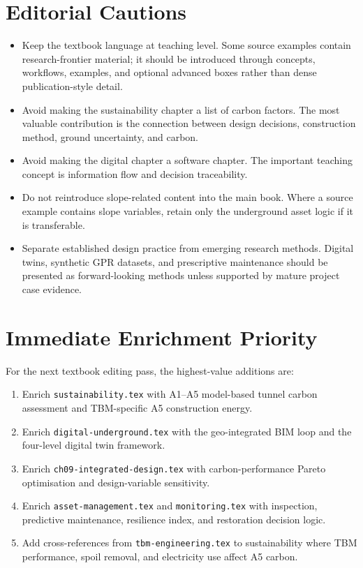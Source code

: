 \documentclass[11pt]{article}
\begin{document}
\section{Editorial Cautions}

\begin{itemize}
  \item Keep the textbook language at teaching level. Some source examples contain
  research-frontier material; it should be introduced through concepts,
  workflows, examples, and optional advanced boxes rather than dense
  publication-style detail.
  \item Avoid making the sustainability chapter a list of carbon factors. The
  most valuable contribution is the connection between design decisions,
  construction method, ground uncertainty, and carbon.
  \item Avoid making the digital chapter a software chapter. The important
  teaching concept is information flow and decision traceability.
  \item Do not reintroduce slope-related content into the main book. Where a
  source example contains slope variables, retain only the underground asset
  logic if it is transferable.
  \item Separate established design practice from emerging research methods.
  Digital twins, synthetic GPR datasets, and prescriptive maintenance should be
  presented as forward-looking methods unless supported by mature project case
  evidence.
\end{itemize}

\section{Immediate Enrichment Priority}

For the next textbook editing pass, the highest-value additions are:

\begin{enumerate}
  \item Enrich \texttt{sustainability.tex} with A1--A5 model-based tunnel carbon
  assessment and TBM-specific A5 construction energy.
  \item Enrich \texttt{digital-underground.tex} with the geo-integrated BIM loop
  and the four-level digital twin framework.
  \item Enrich \texttt{ch09-integrated-design.tex} with carbon-performance
  Pareto optimisation and design-variable sensitivity.
  \item Enrich \texttt{asset-management.tex} and \texttt{monitoring.tex} with
  inspection, predictive maintenance, resilience index, and restoration
  decision logic.
  \item Add cross-references from \texttt{tbm-engineering.tex} to sustainability
  where TBM performance, spoil removal, and electricity use affect A5 carbon.
\end{enumerate}
\end{document}
